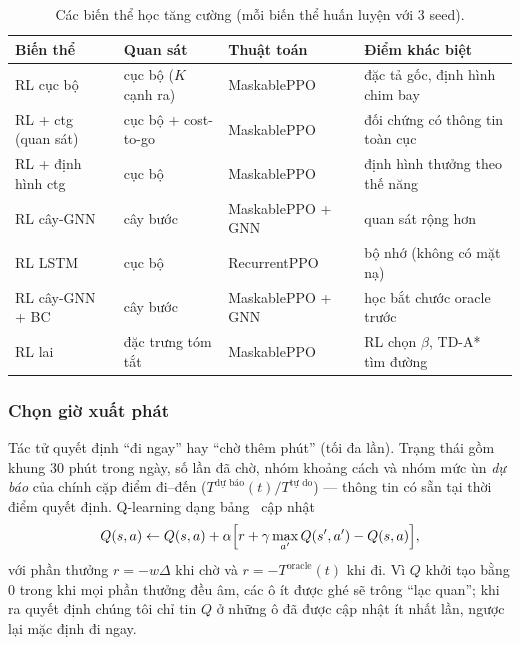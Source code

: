 \begin{table}[H]
\centering\small
\renewcommand{\arraystretch}{1.2}
\caption{Các biến thể học tăng cường (mỗi biến thể huấn luyện với 3 seed).}
\label{tab:rl-variants}
\begin{tabularx}{\linewidth}{>{\raggedright\arraybackslash}p{3.2cm}>{\raggedright\arraybackslash}p{3.3cm}>{\raggedright\arraybackslash}p{2.6cm}X}
\toprule
\textbf{Biến thể} & \textbf{Quan sát} & \textbf{Thuật toán} & \textbf{Điểm khác biệt} \\
\midrule
RL cục bộ & cục bộ ($K$ cạnh ra) & MaskablePPO & đặc tả gốc, định hình chim bay \\
RL + ctg (quan sát) & cục bộ + cost-to-go & MaskablePPO & đối chứng có thông tin toàn cục \\
RL + định hình ctg & cục bộ & MaskablePPO & định hình thưởng theo thế năng \\
RL cây-GNN & cây \TreeDepth{} bước & MaskablePPO + GNN & quan sát rộng hơn \\
RL LSTM & cục bộ & RecurrentPPO & bộ nhớ (không có mặt nạ) \\
RL cây-GNN + BC & cây \TreeDepth{} bước & MaskablePPO + GNN & học bắt chước oracle trước \\
RL lai & 12 đặc trưng tóm tắt & MaskablePPO & RL chọn $\beta$, TD-A* tìm đường \\
\bottomrule
\end{tabularx}
\end{table}

\subsubsection{Chọn giờ xuất phát}\label{sec:method:departure}

Tác tử quyết định ``đi ngay'' hay ``chờ thêm \WaitStep{} phút'' (tối đa \MaxWaits{} lần). Trạng thái gồm khung 30 phút
trong ngày, số lần đã chờ, nhóm khoảng cách và nhóm mức ùn \emph{dự báo} của chính cặp điểm đi--đến
($T^{\text{dự báo}}(t)/T^{\text{tự do}}$) --- thông tin có sẵn tại thời điểm quyết định. Q-learning dạng bảng~\cite{watkins1992}
cập nhật
\begin{equation}
Q(s,a) \leftarrow Q(s,a) + \alpha\Bigl[r + \gamma\max_{a'}Q(s',a') - Q(s,a)\Bigr],
\label{eq:qlearning}
\end{equation}
với phần thưởng $r=-w\Delta$ khi chờ và $r=-T^{\text{oracle}}(t)$ khi đi. Vì $Q$ khởi tạo bằng 0 trong khi mọi phần thưởng
đều âm, các ô ít được ghé sẽ trông ``lạc quan''; khi ra quyết định chúng tôi chỉ tin $Q$ ở những ô đã được cập nhật ít
nhất \DepMinVisits{} lần, ngược lại mặc định đi ngay.

